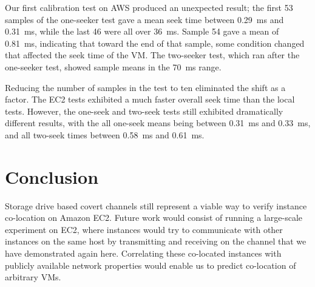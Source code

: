 \documentclass[conference]{IEEEtran}
\begin{document}
Our first calibration test on AWS produced an unexpected result; the first \num{53} samples of the one-seeker test gave
  a mean seek time between \SI{0.29}{ms} and \SI{0.31}{ms}, while the last \num{46} were all over \SI{36}{ms}.
Sample \num{54} gave a mean of \SI{0.81}{ms}, indicating that toward the end of that sample, some condition changed
  that affected the seek time of the VM.
The two-seeker test, which ran after the one-seeker test, showed sample means in the \SI{70}{ms} range.

Reducing the number of samples in the test to ten eliminated the shift as a factor.
The EC2 tests exhibited a much faster overall seek time than the local tests.
However, the one-seek and two-seek tests still exhibited dramatically different results, with the all one-seek means
  being between \SI{0.31}{ms} and \SI{0.33}{ms}, and all two-seek times between \SI{0.58}{ms} and \SI{0.61}{ms}.

\section{Conclusion}
Storage drive based covert channels still represent a viable way to verify instance co-location on Amazon EC2.
Future work would consist of running a large-scale experiment on EC2, where instances would try to communicate with
  other instances on the same host by transmitting and receiving on the channel that we have demonstrated again here.
Correlating these co-located instances with publicly available network properties would enable us to predict
  co-location of arbitrary VMs.




\end{document}

